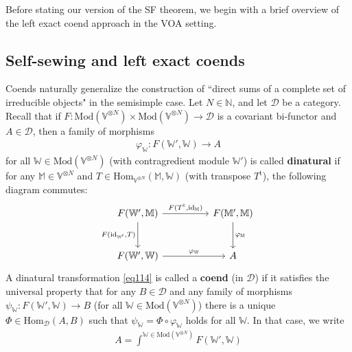 \documentclass[11pt,b5paper,notitlepage]{article}
\theoremstyle{definition}
\theoremstyle{plain}
\newcommand{\tr}{\mathrm{t}} %
\newcommand{\Hom}{\mathrm{Hom}}
\newcommand{\scr}{\mathscr}
\newcommand{\Vbb}{\mathbb V}
\newcommand{\Wbb}{\mathbb W}
\newcommand{\Mbb}{\mathbb M}
\newcommand{\Nbb}{\mathbb N}
\newcommand{\<}{\left\langle}
\renewcommand{\>}{\right\rangle}
\newcommand{\Mod}{\mathrm{Mod}}
\newcommand{\id}{\mathrm{id}}
\numberwithin{equation}{section}
\begin{document}
Before stating our version of the SF theorem, we begin with a brief overview of the left exact coend approach in the VOA setting.





\subsection{Self-sewing and left exact coends}\label{lb56}




Coends naturally generalize the construction of ``direct sums of a complete set of irreducible objects" in the semisimple case. Let $N\in\Nbb$, and let $\scr D$ be a category.  Recall that if $F:\Mod(\Vbb^{\otimes N})\times \Mod(\Vbb^{\otimes N})\rightarrow\scr D$ is a covariant bi-functor and $A\in\scr D$,  then a family of morphisms
\begin{align}\label{eq114}
\varphi_\Wbb:F(\Wbb', \Wbb)\rightarrow A
\end{align}
for all $\Wbb\in\Mod(\Vbb^{\otimes N})$ (with contragredient module $\Wbb'$) is called \textbf{dinatural} if for any $\Mbb\in\Vbb^{\otimes N}$ and $T\in\Hom_{\Vbb^{\otimes N}}(\Mbb,\Wbb)$ (with transpose $T^\tr$), the following diagram commutes:
\begin{equation*}
\begin{tikzcd}[row sep=large, column sep=huge]
F(\Wbb',\Mbb) \arrow[r,"{F(T^\tr,\id_\Mbb)}"] \arrow[d,"{F(\id_{\Wbb'},T)}"'] & F(\Mbb',\Mbb) \arrow[d,"\varphi_\Mbb"] \\
F(\Wbb',\Wbb) \arrow[r,"\varphi_\Wbb"]           & A         
\end{tikzcd}
\end{equation*}
A dinatural transformation \eqref{eq114} is called a \textbf{coend} (in $\scr D$) if it satisfies the universal property that for any $B\in\scr D$ and any family of morphisms $\psi_\Wbb:F(\Wbb',\Wbb)\rightarrow B$ (for all $\Wbb\in\Mod(\Vbb^{\otimes N})$) there is a unique $\Phi\in\Hom_{\scr D}(A,B)$ such that $\psi_\Wbb=\Phi\circ\varphi_\Wbb$ holds for all $\Wbb$. In that case, we write
\begin{align*}
A=\int^{\Wbb\in\Mod(\Vbb^{\otimes N})}F(\Wbb',\Wbb)
\end{align*}
\end{document}
